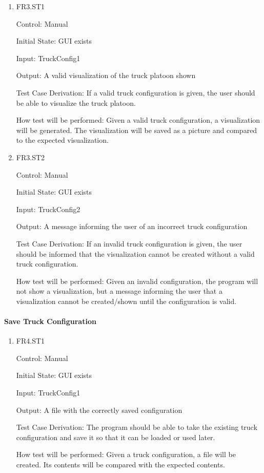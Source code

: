 \documentclass[12pt, titlepage]{article}
\begin{document}
\begin{enumerate}

  \item{FR3.ST1\\}

  Control: Manual

  Initial State: GUI exists

  Input: TruckConfig1

  Output: A valid visualization of the truck platoon shown

  Test Case Derivation: If a valid truck configuration is given, the user should be able to
  visualize the truck platoon.

  How test will be performed: Given a valid truck configuration, a visualization will be generated.
  The visualization will be saved as a picture and compared to the expected visualization.

  \item{FR3.ST2\\}

  Control: Manual

  Initial State: GUI exists

  Input: TruckConfig2

  Output: A message informing the user of an incorrect truck configuration

  Test Case Derivation: If an invalid truck configuration is given, the user should be informed
  that the visualization cannot be created without a valid truck configuration.

  How test will be performed: Given an invalid configuration, the program will not show
  a visualization, but a message informing the user that a visualization cannot be created/shown
  until the configuration is valid.

\end{enumerate}

\paragraph{Save Truck Configuration}

\begin{enumerate}

  \item{FR4.ST1\\}

  Control: Manual

  Initial State: GUI exists

  Input: TruckConfig1

  Output: A file with the correctly saved configuration

  Test Case Derivation: The program should be able to take the existing truck configuration and
  save it so that it can be loaded or used later.

  How test will be performed: Given a truck configuration, a file will be created. Its contents
  will be compared with the expected contents.

\end{enumerate}
\end{document}
